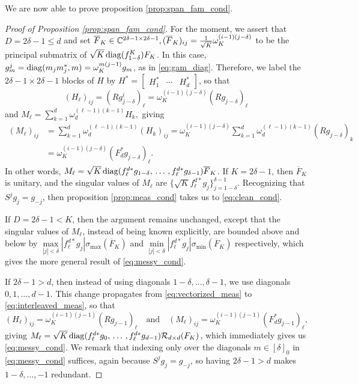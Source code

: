 We are now able to prove proposition \ref{prop:span_fam_cond}.

\begin{proof}[Proof of Proposition \ref{prop:span_fam_cond}]
  For the moment, we assert that $D = 2 \delta - 1 \le d$ and set $\overline{F}_K \in \mathbb{C}^{2 \delta - 1 \times 2 \delta - 1}, (\overline{F}_K)_{ij} = \frac{1}{\sqrt{K}}\omega_K^{(i-1)(j-\delta)}$ to be the principal submatrix of $\sqrt{K} \operatorname{diag}(f^K_{1 - \delta}) F_K$.  In this case, $g_m^j = \operatorname{diag}(m_j m_j^*, m) = \omega_K^{m(j - 1)} g_m$, as in \eqref{eq:gam_diag}.  Therefore, we label the $2 \delta - 1 \times 2 \delta - 1$ blocks of $H$ by $H^* = \begin{bmatrix} H_1^* & \cdots & H_d^* \end{bmatrix}$, so that \[(H_\ell)_{ij} = (R g_{j - \delta}^i)_\ell = \omega_K^{(i - 1)(j - \delta)}(R g_{j - \delta})_\ell\] and $M_\ell = \sum_{k = 1}^d \omega_d^{(\ell - 1)(k - 1)} H_k,$ giving \begin{align*} (M_\ell)_{ij} &= \sum_{k = 1}^d \omega_d^{(\ell - 1)(k - 1)} (H_k)_{ij} = \omega_K^{(i - 1)(j - \delta)} \sum_{k = 1}^d \omega_d^{(\ell - 1)(k - 1)} (Rg_{j - \delta})_k \\ &= \omega_K^{(i - 1)(j - \delta)} (F_d^* g_{j - \delta})_\ell. \end{align*}  In other words, $M_\ell = \sqrt{K} \operatorname{diag}(f_\ell^{d*} g_{1 - \delta},\, \ldots\, , f_\ell^{d*} g_{\delta - 1}) \overline{F}_K$.  If $K = 2 \delta - 1$, then $\overline{F}_K$ is unitary, and the singular values of $M_\ell$ are $\{\sqrt{K} f_\ell^{d *} g_j\}_{j = 1 - \delta}^{\delta - 1}$.  Recognizing that $S^j g_j = g_{-j}$, then proposition \ref{prop:meas_cond} takes us to \eqref{eq:clean_cond}.

  If $D = 2 \delta - 1 < K$, then the argument remains unchanged, except that the singular values of $M_\ell$, instead of being known explicitly, are bounded above and below by $\max\limits_{|j| < \delta} |f_\ell^{d *} g_j| \sigma_{\max}(\overline{F}_K)$ and $\min\limits_{|j| < \delta} |f_\ell^{d *} g_j| \sigma_{\min}(\overline{F}_K)$ respectively, which gives the more general result of \eqref{eq:messy_cond}.

  If $2 \delta - 1 > d$, then instead of using diagonals $1 - \delta, \ldots, \delta - 1$, we use diagonals $0, 1, \ldots, d - 1$.  This change propagates from \eqref{eq:vectorized_meas} to \eqref{eq:interleaved_meas}, so that \[(H_\ell)_{ij} = \omega_K^{(i - 1)(j - 1)} (R g_{j - 1})_\ell \quad \text{and} \quad (M_\ell)_{ij} = \omega_K^{(i - 1)(j - 1)} (F_d^* g_{j - 1})_\ell,\] giving $M_\ell = \sqrt{K} \operatorname{diag}(f_\ell^{d*} g_0,\, \ldots\, , f_\ell^{d*} g_{d - 1})\mathcal{R}_{d \times d}(F_K)$, which immediately gives us \eqref{eq:messy_cond}.  We remark that indexing only over the diagonals $m \in [\delta]_0$ in \eqref{eq:messy_cond} suffices, again because $S^j g_j = g_{-j}$, so having $2 \delta - 1 > d$ makes $1 - \delta, \ldots, -1$ redundant.
  
\end{proof}
